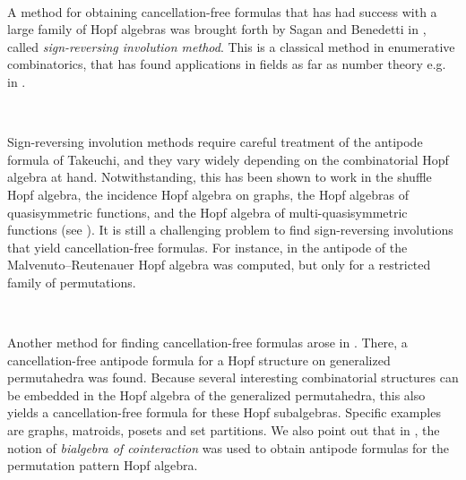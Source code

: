 \documentclass[12pt, reqno]{amsart}
\theoremstyle{definition}
\begin{document}


\

A method for obtaining cancellation-free formulas that has had success with a large family of Hopf algebras was brought forth by Sagan and Benedetti in \cite{BS2017}, called \textit{sign-reversing involution method}.
This is a classical method in enumerative combinatorics, that has found applications in fields as far as number theory e.g. in \cite{zagier2009one}.


\

Sign-reversing involution methods require careful treatment of the antipode formula of Takeuchi, and they vary widely depending on the combinatorial Hopf algebra at hand.
Notwithstanding, this has been shown to work in the shuffle Hopf algebra, the incidence Hopf algebra on graphs, the Hopf algebras of quasisymmetric functions, and the Hopf algebra of multi-quasisymmetric functions (see \cite{BS2017}). It is still a challenging problem to find sign-reversing involutions that yield cancellation-free formulas.
For instance, in \cite{MalvenutoReutenauer,xu2022cancellation} the antipode of the Malvenuto–Reutenauer Hopf algebra was computed, but only for a restricted family of permutations.

\

Another method for finding cancellation-free formulas arose in \cite{aguiar2017hopf}.
There, a cancellation-free antipode formula for a Hopf structure on generalized permutahedra was found. 
Because several interesting combinatorial structures can be embedded in the Hopf algebra of the generalized permutahedra, this also yields a cancellation-free formula for these Hopf subalgebras.
Specific examples are graphs, matroids, posets and set partitions.
We also point out that in \cite{Foissy}, the notion of \emph{bialgebra of cointeraction} was used to obtain antipode formulas for the permutation pattern Hopf algebra.

\
\end{document}
